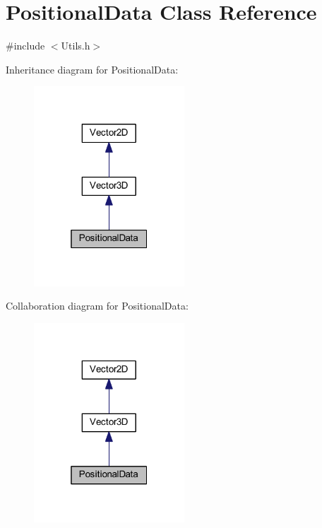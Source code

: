 \hypertarget{class_positional_data}{}\section{Positional\+Data Class Reference}
\label{class_positional_data}


{\ttfamily \#include $<$Utils.\+h$>$}



Inheritance diagram for Positional\+Data\+:
\nopagebreak
\begin{figure}[H]
\begin{center}
\leavevmode
\includegraphics[width=160pt]{class_positional_data__inherit__graph}
\end{center}
\end{figure}


Collaboration diagram for Positional\+Data\+:
\nopagebreak
\begin{figure}[H]
\begin{center}
\leavevmode
\includegraphics[width=160pt]{class_positional_data__coll__graph}
\end{center}
\end{figure}
